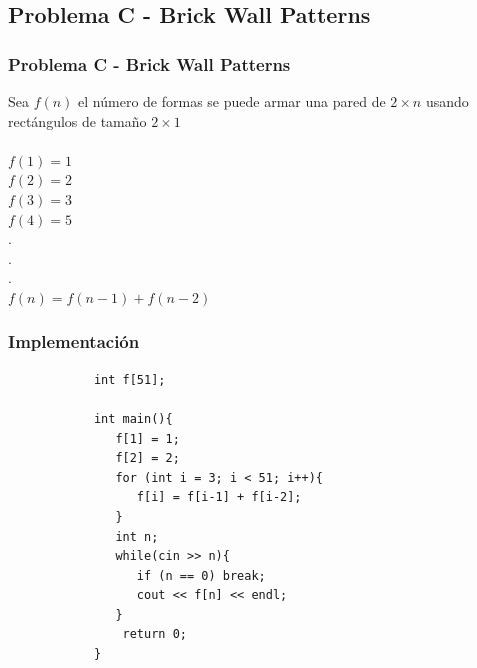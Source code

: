 \documentclass{beamer}
\begin{document}
	\subsection{Problema C - Brick Wall Patterns}
	\begin{frame}
		\frametitle{Problema C - Brick Wall Patterns}
		Sea $f(n)$ el número de formas se puede armar una pared de $2 \times n$ usando rectángulos de tamaño $2 \times 1$\\
		\quad \\
		$f(1) = 1$\\ \pause
		$f(2) = 2$\\ \pause
		$f(3) = 3$\\ \pause
		$f(4) = 5$\\ \pause
		.\\
		.\\
		.\\
		$f(n) = f(n-1) + f(n-2)$
	\end{frame}
	
	\begin{frame}
		\frametitle{Implementación}
		\begin{lstlisting}
			int f[51];
			
			int main(){
			   f[1] = 1;
			   f[2] = 2;
			   for (int i = 3; i < 51; i++){
			      f[i] = f[i-1] + f[i-2];
			   }
			   int n;
			   while(cin >> n){
			      if (n == 0) break;
			      cout << f[n] << endl;
			   }
			    return 0;
			}
		\end{lstlisting}
	\end{frame}
\end{document}
